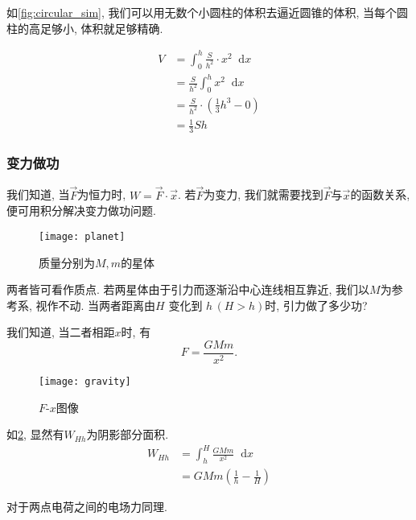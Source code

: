 \documentclass[UTF8]{mathrep}
\newcommand*{\dif}{\mathop{}\!\mathrm{d}}
\begin{document}
如\cref{fig:circular_sim}, 我们可以用无数个小圆柱的体积去逼近圆锥的体积, 当每个圆柱的高足够小, 体积就足够精确.

\begin{align*}
  V & = \int _0^{h} \frac{S}{h^{2} }\cdot x^{2} \dif x         \\
  & = \frac{S}{h^{2} }\int _0^{h} x^{2}\dif x                \\
  & = \frac{S}{h^{2}} \cdot \left(\frac{1}{3} h^3 -0 \right) \\
  & = \frac{1}{3} Sh
\end{align*}

\subsubsection{变力做功}
我们知道, 当$\vec{F} $为恒力时, $W = \vec{F} \cdot \vec{x} $.
若$\vec{F} $为变力, 我们就需要找到$\vec{F} $与$\vec{x} $的函数关系, 便可用积分解决变力做功问题.

\begin{figure}
  \begin{center}
    \texttt{[image: planet]}
  \end{center}
  \caption{质量分别为$M,m$的星体}\label{fig:planet}
\end{figure}

\begin{example}
  两者皆可看作质点.
  若两星体由于引力而逐渐沿中心连线相互靠近,
  我们以$M$为参考系, 视作不动.
  当两者距离由$H$ 变化到 $h \, (H>h)$时, 引力做了多少功?

  我们知道, 当二者相距$x$时, 有
  \[
    F = \frac{GMm}{x^2}
  .\]

  \begin{figure}[!ht]
    \begin{center}
      \texttt{[image: gravity]}
    \end{center}
    \caption{$F$-$x$图像}\label{fig:Fx}
  \end{figure}

  如\cref{fig:Fx}, 显然有$W_{Hh}$为阴影部分面积.
  \begin{align*}
    W_{Hh} & = \int _{h} ^{H} \frac{GMm}{x^2} \dif x    \\
    & = GMm \left(\frac{1}{h}-\frac{1}{H}\right)
  \end{align*}

  对于两点电荷之间的电场力同理.

\end{example}
\end{document}
